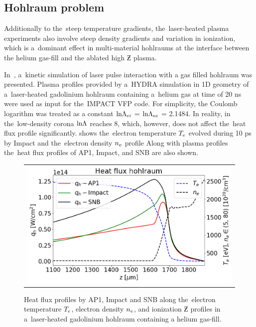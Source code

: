 \subsection{Hohlraum problem}
Additionally to the~steep temperature gradients, the~laser-heated plasma 
experiments also involve steep density gradients and variation in ionization,
which is a~dominant effect in multi-material hohlraums
at the interface between the helium gas-fill and 
the ablated high $\Zbar$ plasma.

In~\cite{Brodrick_PoP2017}, a~kinetic simulation of laser pulse interaction 
with a gas filled hohlraum was presented. 
Plasma profiles provided by a~HYDRA simulation in 1D
geometry of a~laser-heated gadolinium hohlraum containing a~helium 
gas at time of 20 ns were used as input for the~IMPACT 
\cite{Kingham_JCP2004} VFP code.  
For simplicity, the Coulomb logarithm was treated as a
constant $\text{ln}\Lambda_{ei}$ = $\text{ln}\Lambda_{ee}$ = 2.1484. In reality, in the~low-density 
corona $\text{ln}\Lambda$ reaches 8, which, however, does not affect the~heat flux profile 
significantly. 
 shows the~electron temperature $T_e$ 
evolved during 10 ps by Impact and the~electron density $n_e$ profile
Along with plasma profiles the~heat flux profiles
of AP1, Impact, and SNB are also shown. 

\begin{figure}[htb]
  \begin{center}
    \begin{tabular}{c}
      \includegraphics[width=\figscale\textwidth]{../VFPdata/C7_GdHohlraum_heatflux.png}
    \end{tabular}
  \caption{
  Heat flux profiles by AP1, Impact and SNB along 
  the~electron temperature $T_e$, electron density $n_e$, 
  and ionization $\Zbar$ profiles in a~laser-heated gadolinium hohlraum 
  containing a helium gas-fill.
  }
  \label{fig:Gd_VFP_10ps_heatflux}
  \end{center} 
\end{figure}

